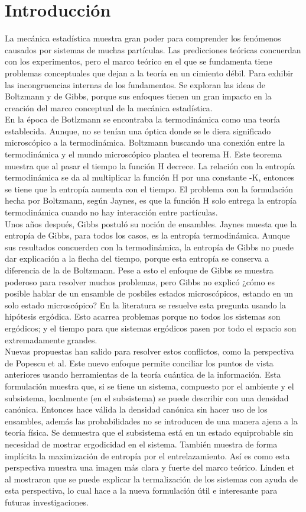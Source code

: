 \chapter{Introducción}
La mecánica estadística muestra gran poder para comprender los fenómenos causados por sistemas de muchas partículas. Las predicciones teóricas concuerdan con los experimentos, pero el marco teórico en el que se fundamenta tiene problemas conceptuales que dejan a la teoría en un cimiento débil.  Para exhibir las incongruencias internas de los fundamentos. Se exploran las ideas de Boltzmann y de Gibbs, porque sus enfoques tienen un gran impacto en la creación del marco conceptual de la mecánica estadística.
\\ 
En la época de Botlzmann se encontraba la termodinámica como una teoría establecida. Aunque, no se tenían una óptica donde se le diera significado microscópico a la termodinámica. Boltzmann buscando una conexión entre la termodinámica y  el mundo microscópico plantea el teorema H. Este teorema muestra que al pasar el tiempo la función H decrece. La relación con la entropía termodinámica se da al multiplicar la función H por una constante -K, entonces se tiene que la entropía aumenta con el tiempo. El problema con la formulación hecha por Boltzmann, según Jaynes, es que la función H solo entrega la entropía termodinámica  cuando no hay interacción entre partículas.
\\
Unos años después, Gibbs postuló su noción de ensambles. Jaynes muesta que la entropía de Gibbs, para todos los casos, es la entropía termodinámica. Aunque sus resultados concuerden con la termodinámica, la entropía de Gibbs no puede dar explicación a la flecha del tiempo, porque esta entropía se conserva a diferencia de la de Boltzmann. Pese a esto el enfoque de Gibbs se muestra poderoso para resolver muchos problemas, pero Gibbs no explicó ¿cómo es posible hablar de un ensamble de posbiles estados microscópicos, estando en un solo estado microscópico? En la literatura se resuelve esta pregunta usando la hipótesis ergódica. Esto acarrea problemas porque no todos los sistemas son ergódicos; y el tiempo para que sistemas ergódicos pasen por todo el espacio son extremadamente grandes. 
\\
Nuevas propuestas han salido para resolver estos conflictos, como la perspectiva de Popescu et al. Este nuevo enfoque permite conciliar los puntos de vista anteriores usando herramientas de la teoría cuántica de la información. Esta formulación muestra que, si se tiene un sistema, compuesto por el ambiente y el subsistema, localmente (en el subsistema) se puede describir con una densidad canónica. Entonces hace válida la densidad canónica sin hacer uso de los ensambles, además las probabilidades no se introducen de una manera ajena a la teoría física. Se demuestra que el subsistema está en un estado equiprobable sin necesidad de mostrar ergodicidad en el sistema. También muestra de forma implícita la maximización de entropía por el entrelazamiento. Así es como esta perspectiva muestra una imagen más clara y fuerte del marco teórico. Linden et al mostraron que se puede explicar la termalización de los sistemas con ayuda de esta perspectiva, lo cual hace a la nueva formulación útil e interesante para futuras investigaciones.

